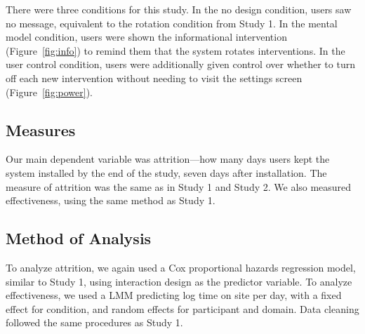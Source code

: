 There were three conditions for this study. %
In the no design condition, users saw no message, equivalent to the rotation condition from Study 1. In the mental model condition, users were shown the informational intervention (Figure~\ref{fig:info}) to remind them that the system rotates interventions. In the user control condition, users were additionally given control over whether to turn off each new intervention without needing to visit the settings screen (Figure~\ref{fig:power}).

\subsection{Measures}

Our main dependent variable was attrition---how many days users kept the system installed by the end of the study, seven days after installation. The measure of attrition was the same as in Study 1 and Study 2. We also measured effectiveness, using the same method as Study 1.

\subsection{Method of Analysis}

To analyze attrition, we again used a Cox proportional hazards regression model, similar to Study 1, using interaction design as the predictor variable. To analyze effectiveness, we used a LMM predicting log time on site per day, with a fixed effect for condition, and random effects for participant and domain. Data cleaning followed the same procedures as Study 1.




